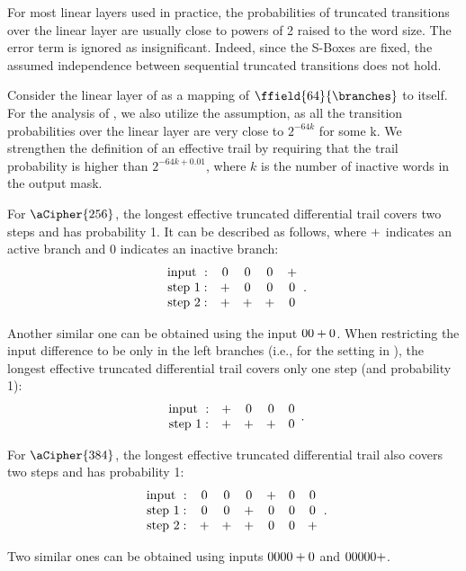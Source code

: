 For most linear layers used in practice, the probabilities of truncated transitions over the linear layer are usually close to powers of 2 raised to the word size. The error term is ignored as insignificant. Indeed, since the S-Boxes are fixed, the assumed independence between sequential truncated transitions does not hold. 

Consider the linear layer of \aCipher{} as a mapping of $\ffield{64}{\branches}$ to itself. For the analysis of \aCipher{}, we also utilize the assumption, as all the transition probabilities over the linear layer are very close to $2^{-64k}$ for some k. We strengthen the definition of an effective trail by requiring that the trail probability is higher than $2^{-64k+0.01}$, where $k$ is the number of inactive words in the output mask.

For $\aCipher{256}$, the longest effective truncated differential trail covers two steps and has probability 1. It can be described as follows, where $+$ indicates an active branch and $0$ indicates an inactive branch:
$$
\begin{array}{ccccc}
\text{input } : & 0 & 0 & 0 & +\\
\text{step } 1: & + & 0 & 0 & 0\\
\text{step } 2: & + & + & + & 0
\end{array}.
$$

Another similar one can be obtained using the input $00+0$. When restricting the input difference to be only in the left branches (i.e., for the setting in ), the longest effective truncated differential trail covers only one step (and probability 1):
$$
\begin{array}{ccccc}
\text{input } : & + & 0 & 0 & 0\\
\text{step } 1: & + & + & + & 0 
\end{array}.
$$

For $\aCipher{384}$, the longest effective truncated differential trail also covers two steps and has probability 1:
$$
\begin{array}{ccccccc}
\text{input } : & 0 & 0 & 0 & + & 0 & 0\\
\text{step } 1: & 0 & 0 & + & 0 & 0 & 0\\
\text{step } 2: & + & + & + & 0 & 0 & +
\end{array}.
$$

Two similar ones can be obtained using inputs $0000+0$ and $00000+$.

